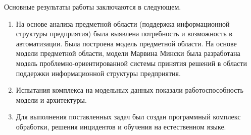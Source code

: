 
Основные результаты работы заключаются в следующем.
\begin{enumerate}
  \item На основе анализа предметной области (поддержка информационной структуры предприятия) была выявлена потребность и возможность в автоматизации. Была построена модель предметной области. На основе модели предметной области, модели Марвина Мински была разработана модель проблемно-ориентированной системы принятия решений в области поддержки информационной структуры предприятия.  
  \item Испытания комплекса на модельных данных показали работоспособность модели и архитектуры.  
  \item Для выполнения поставленных задач был создан программный комплекс обработки, решения инцидентов и обучения на естественном языке. 
\end{enumerate}

